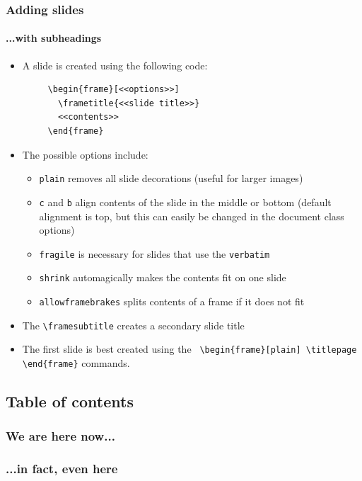 \documentclass[xcolor=pdftex,t,11pt]{beamer}
\begin{document}
\begin{frame}
\frametitle{Adding slides}
\framesubtitle{...with subheadings}
\begin{itemize}
\item A slide is created using the following code:
	\begin{verbatim}
	 \begin{frame}[<<options>>]
	   \frametitle{<<slide title>>}
	   <<contents>>
	 \end{frame}
	\end{verbatim}
\item The possible options include:
\begin{itemize}
	\item \verb!plain! removes all slide decorations (useful for larger images)
	\item \verb!c! and \verb!b! align contents of the slide in the middle or bottom (default alignment is top, but this can easily be changed in the document class options)
	\item \verb!fragile! is necessary for slides that use the \verb!verbatim!
	\item \verb!shrink! automagically makes the contents fit on one slide
	\item \verb!allowframebrakes! splits contents of a frame if it does not fit
\end{itemize}
\item The \verb!\framesubtitle! creates a secondary slide title
\item The first slide is best created using the \verb! \begin{frame}[plain] \titlepage \end{frame}! commands.
\end{itemize}
\end{frame}

\subsection{Table of contents}

\begin{frame}
\frametitle{We are here now...}
\end{frame}

\begin{frame}
\frametitle{...in fact, even here}
\end{frame}
\end{document}
